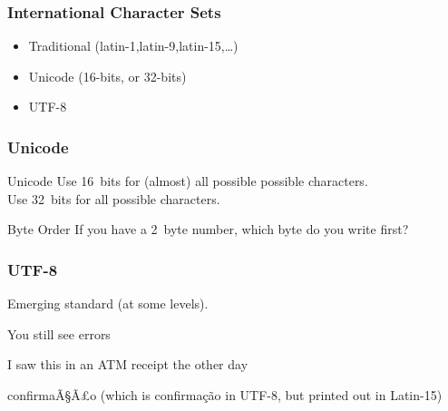 \begin{frame}[fragile]
\frametitle{International Character Sets}

\begin{itemize}
\item Traditional (latin-1,latin-9,latin-15,\ldots)
\item Unicode (16-bits, or 32-bits)
\item UTF-8
\end{itemize}
\end{frame}

\begin{frame}[fragile]
\frametitle{Unicode}

\begin{block}{Unicode}
Use 16~bits for (almost) all possible possible characters.\\
Use 32~bits for all possible characters.
\end{block}

\begin{block}{Byte Order}
If you have a 2~byte number, which byte do you write first?
\end{block}

\end{frame}

\begin{frame}[fragile]
\frametitle{UTF-8}
Emerging standard (at some levels).

\pause

You still see errors

I saw this in an ATM receipt the other day

confirmaÃ§Ã£o (which is confirmação in UTF-8, but printed out in Latin-15)

\end{frame}


